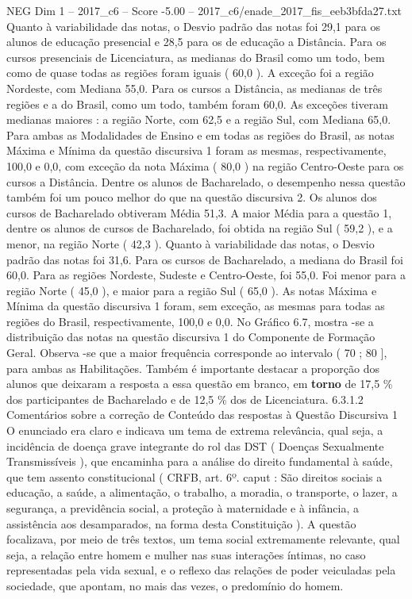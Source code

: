 \begin{textsample}{NEG Dim 1 – 2017\_c6 – Score -5.00 – 2017\_c6/enade\_2017\_fis\_eeb3bfda27.txt}
Quanto à variabilidade das notas, o Desvio padrão das notas foi 29,1 para os alunos de educação presencial e 28,5 para os de educação a Distância.
Para os cursos presenciais de Licenciatura, as medianas do Brasil como um todo, bem como de quase todas as regiões foram iguais ( 60,0 ).
A exceção foi a região Nordeste, com Mediana 55,0.
Para os cursos a Distância, as medianas de três regiões e a do Brasil, como um todo, também foram 60,0.
As exceções tiveram medianas maiores : a região Norte, com 62,5 e a região Sul, com Mediana 65,0.
Para ambas as Modalidades de Ensino e em todas as regiões do Brasil, as notas Máxima e Mínima da questão discursiva 1 foram as mesmas, respectivamente, 100,0 e 0,0, com exceção da nota Máxima ( 80,0 ) na região Centro-Oeste para os cursos a Distância.
Dentre os alunos de Bacharelado, o desempenho nessa questão também foi um pouco melhor do que na questão discursiva 2.
Os alunos dos cursos de Bacharelado obtiveram Média 51,3.
A maior Média para a questão 1, dentre os alunos de cursos de Bacharelado, foi obtida na região Sul ( 59,2 ), e a menor, na região Norte ( 42,3 ).
Quanto à variabilidade das notas, o Desvio padrão das notas foi 31,6.
Para os cursos de Bacharelado, a mediana do Brasil foi 60,0.
Para as regiões Nordeste, Sudeste e Centro-Oeste, foi 55,0.
Foi menor para a região Norte ( 45,0 ), e maior para a região Sul ( 65,0 ).
As notas Máxima e Mínima da questão discursiva 1 foram, sem exceção, as mesmas para todas as regiões do Brasil, respectivamente, 100,0 e 0,0.
No Gráfico 6.7, mostra -se a distribuição das notas na questão discursiva 1 do Componente de Formação Geral.
Observa -se que a maior frequência corresponde ao intervalo ( 70 ; 80 ], para ambas as Habilitações.
Também é importante destacar a proporção dos alunos que deixaram a resposta a essa questão em branco, em \textbf{torno} de 17,5 \% dos participantes de Bacharelado e de 12,5 \% dos de Licenciatura. 6.3.1.2 Comentários sobre a correção de Conteúdo das respostas à Questão Discursiva 1 O enunciado era claro e indicava um tema de extrema relevância, qual seja, a incidência de doença grave integrante do rol das DST ( Doenças Sexualmente Transmissíveis ), que encaminha para a análise do direito fundamental à saúde, que tem assento constitucional ( CRFB, art. 6º. caput : São direitos sociais a educação, a saúde, a alimentação, o trabalho, a moradia, o transporte, o lazer, a segurança, a previdência social, a proteção à maternidade e à infância, a assistência aos desamparados, na forma desta Constituição ).
A questão focalizava, por meio de três textos, um tema social extremamente relevante, qual seja, a relação entre homem e mulher nas suas interações íntimas, no caso representadas pela vida sexual, e o reflexo das relações de poder veiculadas pela sociedade, que apontam, no mais das vezes, o predomínio do homem.

\end{textsample}

